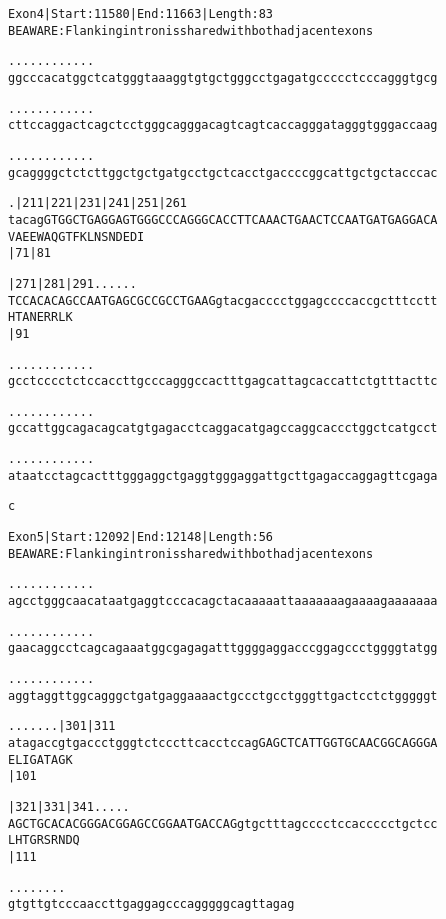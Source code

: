 \documentclass{article}
\begin{document}
\begin{alltt}
Exon 4 | Start: 11580 | End: 11663 | Length: 83
BE AWARE: Flanking intron is shared with both adjacent exons

.    .    .    .    .    .    .    .    .    .    .    .    
ggcccacatggctcatgggtaaaggtgtgctgggcctgagatgccccctcccagggtgcg

.    .    .    .    .    .    .    .    .    .    .    .    
cttccaggactcagctcctgggcagggacagtcagtcaccagggatagggtgggaccaag

.    .    .    .    .    .    .    .    .    .    .    .    
gcaggggctctcttggctgctgatgcctgctcacctgaccccggcattgctgctacccac

.       |211      |221      |231      |241      |251      |261
tacagGTGGCTGAGGAGTGGGCCCAGGGCACCTTCAAACTGAACTCCAATGATGAGGACA
     V  A  E  E  W  A  Q  G  T  F  K  L  N  S  N  D  E  D  I
        |71                           |81                   

        |271      |281      |291 .    .    .    .    .    . 
TCCACACAGCCAATGAGCGCCGCCTGAAGgtacgacccctggagccccaccgctttcctt
  H  T  A  N  E  R  R  L  K                                 
        |91                                                 

   .    .    .    .    .    .    .    .    .    .    .    . 
gcctcccctctccaccttgcccagggccactttgagcattagcaccattctgtttacttc

   .    .    .    .    .    .    .    .    .    .    .    . 
gccattggcagacagcatgtgagacctcaggacatgagccaggcaccctggctcatgcct

   .    .    .    .    .    .    .    .    .    .    .    . 
ataatcctagcactttgggaggctgaggtgggaggattgcttgagaccaggagttcgaga

c
\end{alltt}
\newpage
\begin{alltt}
Exon 5 | Start: 12092 | End: 12148 | Length: 56
BE AWARE: Flanking intron is shared with both adjacent exons

.    .    .    .    .    .    .    .    .    .    .    .    
agcctgggcaacataatgaggtcccacagctacaaaaattaaaaaaagaaaagaaaaaaa

.    .    .    .    .    .    .    .    .    .    .    .    
gaacaggcctcagcagaaatggcgagagatttggggaggacccggagccctggggtatgg

.    .    .    .    .    .    .    .    .    .    .    .    
aggtaggttggcagggctgatgaggaaaactgccctgcctgggttgactcctctgggggt

.    .    .    .    .    .    .             |301      |311  
atagaccgtgaccctgggtctcccttcacctccagGAGCTCATTGGTGCAACGGCAGGGA
                                   E  L  I  G  A  T  A  G  K
                                            |101            

    |321      |331      |341        .    .    .    .    .   
AGCTGCACACGGGACGGAGCCGGAATGACCAGgtgctttagcccctccaccccctgctcc
  L  H  T  G  R  S  R  N  D  Q                              
              |111                                          

 .    .    .    .    .    .    .    .   
gtgttgtcccaaccttgaggagcccagggggcagttagag
\end{alltt}
\end{document}
